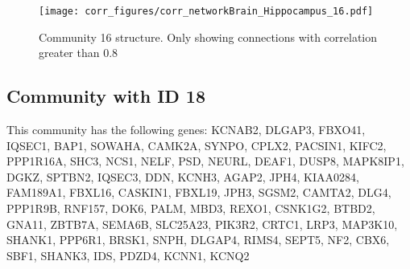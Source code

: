 \begin{figure}[h!]
\centering
\texttt{[image: corr\_figures/corr\_networkBrain\_Hippocampus\_16.pdf]}
\caption{Community 16 structure. Only showing connections with correlation greater than 0.8}
\end{figure}




\subsection*{Community with ID 18}
This community has the following genes: KCNAB2, DLGAP3, FBXO41, IQSEC1, BAP1, SOWAHA, CAMK2A, SYNPO, CPLX2, PACSIN1, KIFC2, PPP1R16A, SHC3, NCS1, NELF, PSD, NEURL, DEAF1, DUSP8, MAPK8IP1, DGKZ, SPTBN2, IQSEC3, DDN, KCNH3, AGAP2, JPH4, KIAA0284, FAM189A1, FBXL16, CASKIN1, FBXL19, JPH3, SGSM2, CAMTA2, DLG4, PPP1R9B, RNF157, DOK6, PALM, MBD3, REXO1, CSNK1G2, BTBD2, GNA11, ZBTB7A, SEMA6B, SLC25A23, PIK3R2, CRTC1, LRP3, MAP3K10, SHANK1, PPP6R1, BRSK1, SNPH, DLGAP4, RIMS4, SEPT5, NF2, CBX6, SBF1, SHANK3, IDS, PDZD4, KCNN1, KCNQ2
\\
